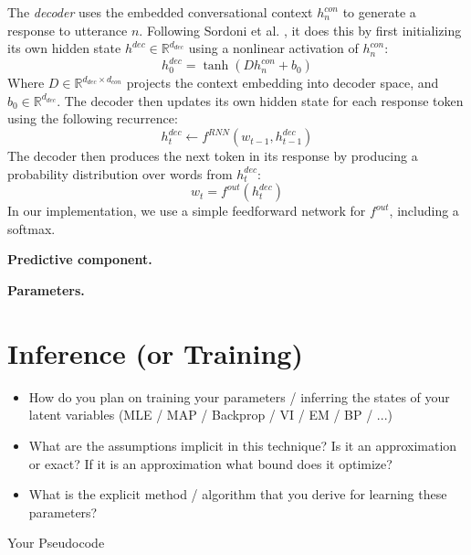 \documentclass{article}
\begin{document}
The \textit{decoder} uses the embedded conversational context $h^{con}_n$ to generate a response to utterance $n$. Following Sordoni et al. \citeyear{sordoni2015hierarchical}, it does this by first initializing its own hidden state $h^{dec} \in \mathbb{R}^{d_{dec}}$ using a nonlinear activation of $h^{con}_n$:
\begin{equation}
  h^{dec}_0 = \tanh(D h^{con}_n + b_0)
\end{equation}
Where $D \in \mathbb{R}^{d_{dec} \times d_{con}}$ projects the context embedding into decoder space, and $b_0 \in \mathbb{R}^{d_{dec}}$. 
The decoder then updates its own hidden state for each response token using the following recurrence:
\begin{equation}
  h^{dec}_{t} \gets f^{RNN}(w_{t-1}, h^{dec}_{t-1})
\end{equation}
The decoder then produces the next token in its response by producing a probability distribution over words from $h^{dec}_t$:
\begin{equation}
  w_t = f^{out}(h^{dec}_t)
\end{equation}
In our implementation, we use a simple feedforward network for $f^{out}$, including a softmax.


\textbf{Predictive component.}

\textbf{Parameters.}


\section{Inference (or Training)}

\begin{itemize}
\item How do you plan on training your parameters / inferring the
  states of your latent variables (MLE / MAP / Backprop / VI / EM / BP / ...)

\item What are the assumptions implicit in this technique? Is it an approximation or exact? If it is an approximation what bound does it optimize?

\item What is the explicit method / algorithm that you derive for learning these parameters?
\end{itemize}


\begin{algorithm}
  \begin{algorithmic}
    \STATE{\lipsum[1]}
  \end{algorithmic}
  \caption{Your Pseudocode}
\end{algorithm}
\end{document}
